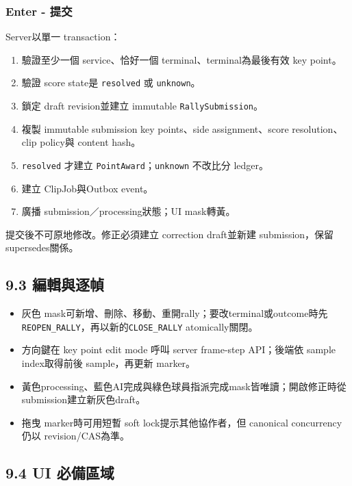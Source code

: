 \documentclass[
  9pt,
  a4paper,
]{article}
\providecommand{\tightlist}{%
  \setlength{\itemsep}{0pt}\setlength{\parskip}{0pt}}
\begin{document}
\subsubsection{Enter - 提交}\label{enter---ux63d0ux4ea4}

Server以單一 transaction：

\begin{enumerate}
\def\labelenumi{\arabic{enumi}.}
\tightlist
\item
  驗證至少一個 service、恰好一個 terminal、terminal為最後有效 key
  point。
\item
  驗證 score state是 \texttt{resolved} 或 \texttt{unknown}。
\item
  鎖定 draft revision並建立 immutable \texttt{RallySubmission}。
\item
  複製 immutable submission key points、side assignment、score
  resolution、clip policy與 content hash。
\item
  \texttt{resolved} 才建立 \texttt{PointAward}；\texttt{unknown}
  不改比分 ledger。
\item
  建立 ClipJob與Outbox event。
\item
  廣播 submission／processing狀態；UI mask轉黃。
\end{enumerate}

提交後不可原地修改。修正必須建立 correction draft並新建 submission，保留
supersedes關係。

\subsection{9.3 編輯與逐幀}\label{93-ux7de8ux8f2fux8207ux9010ux5e40}

\begin{itemize}
\tightlist
\item
  灰色 mask可新增、刪除、移動、重開rally；要改terminal或outcome時先
  \texttt{REOPEN\_\allowbreak{}RALLY}，再以新的\texttt{CLOSE\_\allowbreak{}RALLY} atomically關閉。
\item
  方向鍵在 key point edit mode 呼叫 server frame-step API；後端依 sample
  index取得前後 sample，再更新 marker。
\item
  黃色processing、藍色AI完成與綠色球員指派完成mask皆唯讀；開啟修正時從 submission建立新灰色draft。
\item
  拖曳 marker時可用短暫 soft lock提示其他協作者，但 canonical
  concurrency仍以 revision/CAS為準。
\end{itemize}

\subsection{9.4 UI 必備區域}\label{94-ui-ux5fc5ux5099ux5340ux57df}
\end{document}
